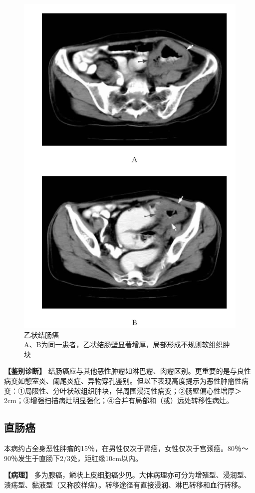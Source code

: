 \begin{figure}[!htbp]
 \centering
 \includegraphics[width=.7\textwidth,height=\textheight,keepaspectratio]{./images/Image00365.jpg}
 \captionsetup{justification=centering}
 \caption{乙状结肠癌\\{\small A、B为同一患者，乙状结肠壁显著增厚，局部形成不规则软组织肿块}}
 \label{fig17-13}
  \end{figure} 

\textbf{【鉴别诊断】}
结肠癌应与其他恶性肿瘤如淋巴瘤、肉瘤区别。更重要的是与良性病变如憩室炎、阑尾炎症、异物穿孔鉴别。但以下表现高度提示为恶性肿瘤性病变：①局限性、分叶状软组织肿块，伴周围浸润性病变；②肠壁偏心性增厚＞2cm；③增强扫描病灶明显强化；④合并有局部和（或）远处转移性病灶。

\subsection{直肠癌}

本病约占全身恶性肿瘤的15％，在男性仅次于胃癌，女性仅次于宫颈癌。80％～90％发生于直肠下2/3处，距肛缘10cm以内。

\textbf{【病理】}
多为腺癌，鳞状上皮细胞癌少见。大体病理亦可分为增殖型、浸润型、溃疡型、黏液型（又称胶样癌）。转移途径有直接浸润、淋巴转移和血行转移。

